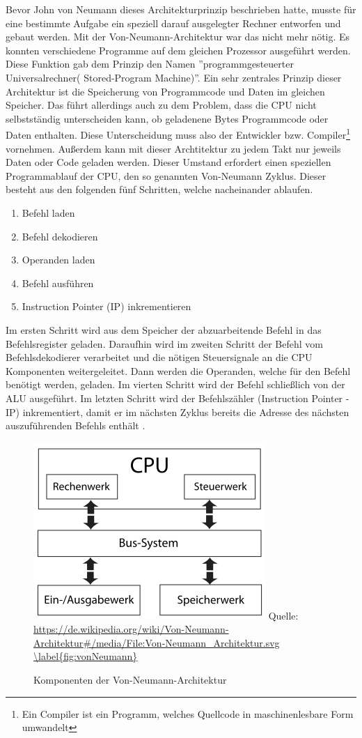 \documentclass[a4paper,12pt]{article}
\begin{document}
\noindent Bevor John von Neumann dieses Architekturprinzip beschrieben hatte, musste für eine bestimmte Aufgabe ein speziell darauf ausgelegter Rechner entworfen und gebaut werden. Mit der Von-Neumann-Architektur war das nicht mehr nötig. Es konnten verschiedene Programme auf dem gleichen Prozessor ausgeführt werden. Diese Funktion gab dem Prinzip den Namen ''programmgesteuerter Universalrechner( Stored-Program Machine)''\cite{TaschenbuchMikroprozessortechnik}.
Ein sehr zentrales Prinzip dieser Architektur ist die Speicherung von Programmcode und Daten im gleichen Speicher. Das führt allerdings auch zu dem Problem, dass die CPU nicht selbstständig unterscheiden kann, ob geladenene Bytes Programmcode oder Daten enthalten. Diese Unterscheidung muss also der Entwickler bzw. Compiler\footnote{Ein Compiler ist ein Programm, welches Quellcode in maschinenlesbare Form umwandelt} vornehmen. Außerdem kann mit dieser Archtitektur zu jedem Takt nur jeweils Daten oder Code geladen werden. Dieser Umstand erfordert einen speziellen Programmablauf der CPU, den so genannten Von-Neumann Zyklus. Dieser besteht aus den folgenden fünf Schritten, welche nacheinander ablaufen.
\newpage
\begin{enumerate}
\item Befehl laden 
\item Befehl dekodieren
\item Operanden laden
\item Befehl ausführen
\item Instruction Pointer (IP) inkrementieren
\end{enumerate}
Im ersten Schritt wird aus dem Speicher der abzuarbeitende Befehl in das Befehlsregister geladen. Daraufhin wird im zweiten Schritt der Befehl vom Befehlsdekodierer verarbeitet und die nötigen Steuersignale an die CPU Komponenten weitergeleitet. Dann werden die Operanden, welche für den Befehl benötigt werden, geladen. Im vierten Schritt wird der Befehl schließlich von der ALU ausgeführt. Im letzten Schritt wird der Befehlszähler (Instruction Pointer - IP) inkrementiert, damit er im nächsten Zyklus bereits die Adresse des nächsten auszuführenden Befehls enthält \cite{unikoelnvnz}.

\begin{figure}[!htb]
\centering
\includegraphics[scale=0.60]{Von-Neumann_Architektur}
\small Quelle: \url{https://de.wikipedia.org/wiki/Von-Neumann-Architektur#/media/File:Von-Neumann_Architektur.svg
\label{fig:vonNeumann}}
\caption{Komponenten der Von-Neumann-Architektur}
\end{figure}
\end{document}
